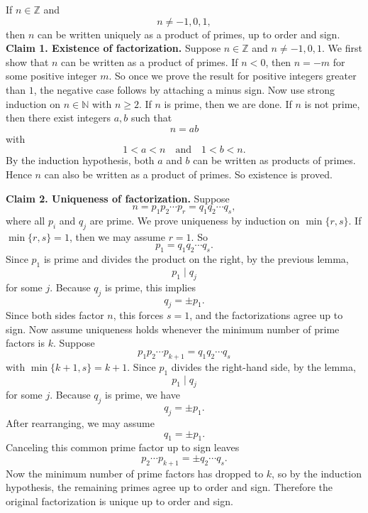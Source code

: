 \begin{theorem}{
    If $n\in\mathbb{Z}$ and
    \[
        n\neq -1,0,1,
    \]
    then $n$ can be written uniquely as a product of primes, up to order and sign.
}
    \textbf{Claim 1. Existence of factorization.}
    Suppose $n\in\mathbb{Z}$ and $n\neq -1,0,1$.
    We first show that $n$ can be written as a product of primes.
    If $n<0$, then $n=-m$ for some positive integer $m$.
    So once we prove the result for positive integers greater than $1$, the negative case follows by attaching a minus sign.
    Now use strong induction on $n\in\mathbb{N}$ with $n\geq 2$.
    If $n$ is prime, then we are done.
    If $n$ is not prime, then there exist integers $a,b$ such that
    \[
        n=ab
    \]
    with
    \[
        1<a<n \quad \text{and} \quad 1<b<n.
    \]
    By the induction hypothesis, both $a$ and $b$ can be written as products of primes.
    Hence $n$ can also be written as a product of primes.
    So existence is proved.

    \textbf{Claim 2. Uniqueness of factorization.}
    Suppose
    \[
        n = p_{1}p_2\cdots p_r = q_{1}q_2\cdots q_s,
    \]
    where all $p_i$ and $q_j$ are prime.
    We prove uniqueness by induction on $\min\{r,s\}$.
    If $\min\{r,s\}=1$, then we may assume $r=1$.
    So
    \[
        p_1 = q_{1}q_2\cdots q_s.
    \]
    Since $p_1$ is prime and divides the product on the right, by the previous lemma,
    \[
        p_1\mid q_j
    \]
    for some $j$.
    Because $q_j$ is prime, this implies
    \[
        q_j = \pm p_1.
    \]
    Since both sides factor $n$, this forces $s=1$, and the factorizations agree up to sign.
    Now assume uniqueness holds whenever the minimum number of prime factors is $k$.
    Suppose
    \[
        p_{1}p_2\cdots p_{k+1} = q_{1}q_2\cdots q_s
    \]
    with $\min\{k+1,s\}=k+1$.
    Since $p_1$ divides the right-hand side, by the lemma,
    \[
        p_1\mid q_j
    \]
    for some $j$.
    Because $q_j$ is prime, we have
    \[
        q_j = \pm p_1.
    \]
    After rearranging, we may assume
    \[
        q_1 = \pm p_1.
    \]
    Canceling this common prime factor up to sign leaves
    \[
        p_2\cdots p_{k+1} = \pm q_2\cdots q_s.
    \]
    Now the minimum number of prime factors has dropped to $k$, so by the induction hypothesis, the remaining primes agree up to order and sign.
    Therefore the original factorization is unique up to order and sign.
\end{theorem}